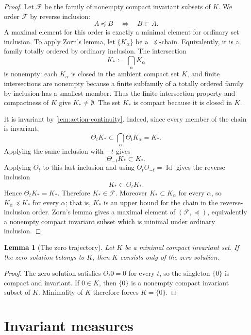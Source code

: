 \documentclass[11pt]{amsart}
\theoremstyle{plain}
\newtheorem{lemma}[theorem]{Lemma}
\theoremstyle{definition}
\theoremstyle{remark}
\numberwithin{equation}{section}
\begin{document}
\begin{proof}
Let \(\mathcal F\) be the family of nonempty compact invariant subsets of
\(K\).  We order \(\mathcal F\) by reverse inclusion:
\[
   A\preceq B
   \quad\Longleftrightarrow\quad
   B\subset A .
\]
A maximal element for this order is exactly a minimal element for ordinary
set inclusion.  To apply Zorn's lemma, let \(\{K_\alpha\}\) be a
\(\preceq\)-chain.  Equivalently, it is a family totally ordered by ordinary
inclusion.  The intersection
\[
   K_*:=\bigcap_\alpha K_\alpha
\]
is nonempty: each \(K_\alpha\) is closed in the ambient compact set \(K\), and
finite intersections are nonempty because a finite subfamily of a totally
ordered family by inclusion has a smallest member.  Thus the finite
intersection property and compactness of \(K\) give \(K_*\ne\emptyset\).
The set \(K_*\) is compact because it is closed in \(K\).

It is invariant by \cref{lem:action-continuity}.  Indeed, since every member
of the chain is invariant,
\[
   \Theta_tK_*
   \subset
   \bigcap_\alpha \Theta_tK_\alpha
   =
   K_* .
\]
Applying the same inclusion with \(-t\) gives
\[
   \Theta_{-t}K_*
   \subset
   K_* .
\]
Applying \(\Theta_t\) to this last inclusion and using
\(\Theta_t\Theta_{-t}=\operatorname{Id}\) gives the reverse inclusion
\[
   K_*
   \subset
   \Theta_tK_* .
\]
Hence \(\Theta_tK_*=K_*\).  Therefore \(K_*\in\mathcal F\).  Moreover
\(K_*\subset K_\alpha\) for every \(\alpha\), so \(K_\alpha\preceq K_*\) for
every \(\alpha\); that is, \(K_*\) is an upper bound for the chain in the
reverse-inclusion order.  Zorn's lemma gives a maximal element of
\((\mathcal F,\preceq)\), equivalently a nonempty compact invariant subset
which is minimal under ordinary inclusion.
\end{proof}

\begin{lemma}[The zero trajectory]\label{lem:zero-trajectory}
Let \(K\) be a minimal compact invariant set.  If the zero solution belongs to
\(K\), then \(K\) consists only of the zero solution.
\end{lemma}

\begin{proof}
The zero solution satisfies \(\Theta_t0=0\) for every \(t\), so the singleton
\(\{0\}\) is compact and invariant.  If \(0\in K\), then \(\{0\}\) is a
nonempty compact invariant subset of \(K\).  Minimality of \(K\) therefore
forces \(K=\{0\}\).
\end{proof}

\section{Invariant measures}
\end{document}
